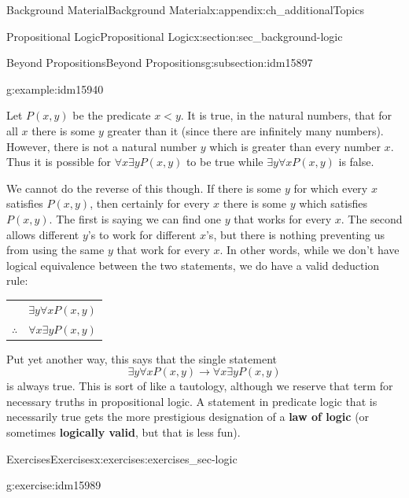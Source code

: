 \documentclass[oneside,10pt,]{book}
\newcommand{\terminology}[1]{\textbf{#1}}
\numberwithin{equation}{chapter}
\newcommand{\hrulethin}  {\noalign{\hrule height 0.04em}}
\def\imp{\rightarrow}
\newcommand{\lt}{<}
\begin{document}
\begin{appendixptx}{Background Material}{}{Background Material}{}{}{x:appendix:ch_additionalTopics}
\begin{sectionptx}{Propositional Logic}{}{Propositional Logic}{}{}{x:section:sec_background-logic}
\begin{subsectionptx}{Beyond Propositions}{}{Beyond Propositions}{}{}{g:subsection:idm15897}
\begin{example}{}{g:example:idm15940}
\par
Let \(P(x,y)\) be the predicate \(x \lt  y\). It is true, in the natural numbers, that for all \(x\) there is some \(y\) greater than it (since there are infinitely many numbers). However, there is not a natural number \(y\) which is greater than every number \(x\).  Thus it is possible for \(\forall x \exists y P(x,y)\) to be true while \(\exists y \forall x P(x,y)\) is false.%
\par
We cannot do the reverse of this though. If there is some \(y\) for which every \(x\) satisfies \(P(x,y)\), then certainly for every \(x\) there is some \(y\) which satisfies \(P(x,y)\). The first is saying we can find one \(y\) that works for every \(x\). The second allows different \(y\)'s to work for different \(x\)'s, but there is nothing preventing us from using the same \(y\) that work for every \(x\).  In other words, while we don't have logical equivalence between the two statements, we do have a valid deduction rule:%
\begin{sidebyside}{1}{0}{0}{0}%
\begin{sbspanel}{1}%
{\centering%
\begin{tabular}{cc}
&\(\exists y \forall x P(x,y)\)\tabularnewline\hrulethin
\(\therefore\)&\(\forall x \exists y P(x,y)\)
\end{tabular}
\par}
\end{sbspanel}%
\end{sidebyside}%
\par
Put yet another way, this says that the single statement%
\begin{equation*}
\exists y \forall x P(x,y) \imp \forall x \exists y P(x,y)
\end{equation*}
is always true.  This is sort of like a tautology, although we reserve that term for necessary truths in propositional logic.  A statement in predicate logic that is necessarily true gets the more prestigious designation of a \terminology{law of logic} (or sometimes \terminology{logically valid}, but that is less fun).%
\end{example}
\end{subsectionptx}
%
%
\typeout{************************************************}
\typeout{************************************************}
%
\begin{exercises-subsection}{Exercises}{}{Exercises}{}{}{x:exercises:exercises_sec-logic}
\begin{divisionexercise}{1}{}{}{g:exercise:idm15989}%

\end{divisionexercise}
\end{exercises-subsection}
\end{sectionptx}
\end{appendixptx}
\end{document}
